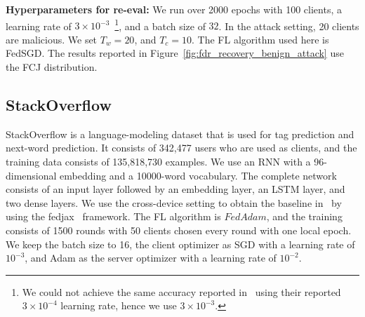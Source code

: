 \noindent\textbf{Hyperparameters for re-eval:} We run over 2000 epochs with 100 clients, a learning rate of $3\times10^{-3}$~\footnote{We could not achieve the same accuracy reported in~\cite{cao2022fedrecover} using their reported $3\times10^{-4}$ learning rate, hence we use $3\times10^{-3}$.}, and a batch size of $32$. In the attack setting, 20 clients are malicious. We set $T_w=20$, and $T_c=10$. The FL algorithm used here is FedSGD. The results reported in Figure~\ref{fig:fdr_recovery_benign_attack} use the FCJ distribution.

\subsection{StackOverflow~\cite{stackoverflow2019}}\label{setup:stackoverflow}
StackOverflow is a language-modeling dataset that is used for tag prediction and next-word prediction. It consists of 342,477 users who are used as clients, and the training data consists of 135,818,730 examples. We use an RNN with a 96-dimensional embedding and a 10000-word vocabulary. The complete network consists of an input layer followed by an embedding layer, an LSTM layer, and two dense layers.
We use the cross-device setting to obtain the baseline in~\cite{reddi2020adaptive} by using the fedjax~\cite{fedjax2021} framework. The FL algorithm is $FedAdam$, and the training consists of 1500 rounds with 50 clients chosen every round with one local epoch. We keep the batch size to 16, the client optimizer as SGD with a learning rate of $10^{-3}$, and Adam as the server optimizer with a learning rate of $10^{-2}$.